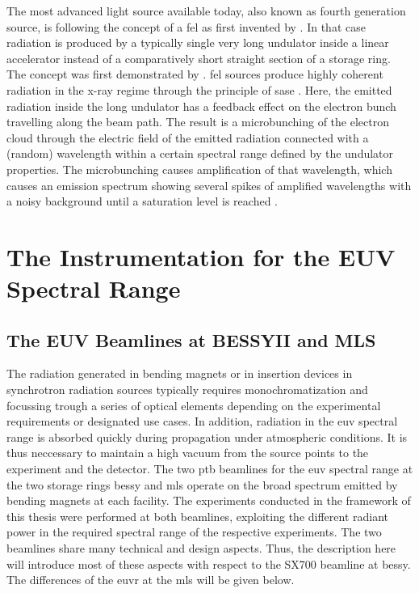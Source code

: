 The most advanced light source available today, also known as fourth generation source, is following the concept of a \gls{fel} as first invented by \textcite{madey_stimulated_1971}. In that case radiation is produced by a typically single very long undulator inside a linear accelerator instead of a comparatively short straight section of a storage ring. The concept was first demonstrated by \textcite{deacon_first_1977}. \Gls{fel} sources produce highly coherent radiation in the x-ray regime through the principle of \gls{sase} \cite{derbenev_possibility_1982, bonifacio_collective_1984}. Here, the emitted radiation inside the long undulator has a feedback effect on the electron bunch travelling along the beam path. The result is a microbunching of the electron cloud through the electric field of the emitted radiation connected with a (random) wavelength within a certain spectral range defined by the undulator properties. The microbunching causes amplification of that wavelength, which causes an emission spectrum showing several spikes of amplified wavelengths with a noisy background until a saturation level is reached \cite{milton_exponential_2001}.

\section{The Instrumentation for the EUV Spectral Range}
\subsection{The EUV Beamlines at BESSYII and MLS}
The radiation generated in bending magnets or in insertion devices in synchrotron radiation sources typically requires monochromatization and focussing trough a series of optical elements depending on the experimental requirements or designated use cases. In addition, radiation in the \gls{euv} spectral range is absorbed quickly during propagation under atmospheric conditions. It is thus neccessary to maintain a high vacuum from the source points to the experiment and the detector. The two \gls{ptb} beamlines for the \gls{euv} spectral range at the two storage rings \gls{bessy} and \gls{mls} operate on the broad spectrum emitted by bending magnets at each facility. The experiments conducted in the framework of this thesis were performed at both beamlines, exploiting the different radiant power in the required spectral range of the respective experiments. The two beamlines share many technical and design aspects. Thus, the description here will introduce most of these aspects with respect to the SX700 beamline at \gls{bessy}. The differences of the \gls{euvr} at the \gls{mls} will be given below.

